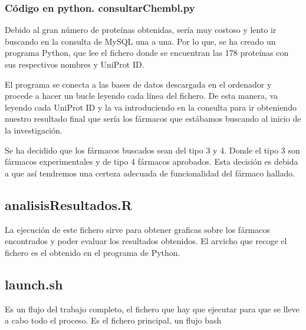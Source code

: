     
    \subsubsection{Código en python. consultarChembl.py}
    Debido al gran número de proteínas obtenidas, sería muy costoso y lento ir buscando en la consulta de MySQL una a una. Por lo que, se ha creado un programa Python, que lee el fichero donde se encuentran las 178 proteínas con sus respectivos nombres y UniProt ID.
    
    El programa se conecta a las bases de datos descargada en el ordenador y procede a hacer un bucle leyendo cada línea del fichero. De esta manera, va leyendo cada UniProt ID y la va introduciendo en la consulta para ir obteniendo nuestro resultado final que sería los fármacos que estábamos buscando al inicio de la investigación. 
    
    Se ha decidido que los fármacos buscados sean del tipo 3 y 4. Donde el tipo 3 son fármacos experimentales y de tipo 4 fármacos aprobados. Esta decisión es debida a que así tendremos una certeza adecuada de funcionalidad del fármaco hallado. 

    
    
\subsection{analisisResultados.R}
La ejecución de este fichero sirve para obtener graficas sobre los fármacos encontrados y poder evaluar los resultados obtenidos. 
El arvicho que recoge el fichero es el obtenido en el programa de Python. 

\subsection{launch.sh}
Es un flujo del trabajo completo, el fichero que hay que ejecutar para que se lleve a cabo todo el proceso. Es el fichero principal, un flujo bash

